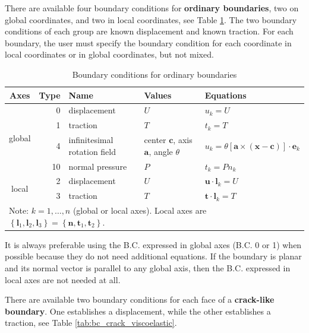 \documentclass[a4paper,fleqn]{book}
\begin{document}
There are available four boundary conditions for \textbf{ordinary boundaries}, two on global coordinates, and two in local coordinates, see Table \ref{tab:bc_ordinary_viscoelastic}. The two boundary conditions of each group are known displacement and known traction. For each boundary, the user must specify the boundary condition for each coordinate in local coordinates or in global coordinates, but not mixed.

\begin{table}[h]
\centering
{\footnotesize
\begin{tabular}{crlll}
\textbf{Axes} & \textbf{Type} & \textbf{Name} & \textbf{Values} & \textbf{Equations} \\
\midrule
\multirow{4}{*}{global} & 0 & displacement & $U$ & $u_k=U$ \\
\cline{2-5}
                        & 1 & traction     & $T$ & $t_k=T$ \\
\cline{2-5}
                        & 4 & infinitesimal rotation field & center $\mathbf{c}$, axis $\mathbf{a}$, angle $\theta$ & $u_k=\theta\left[\mathbf{a}\times\left(\mathbf{x}-\mathbf{c}\right)\right]\cdot\mathbf{e}_k$ \\
\cline{2-5}
                        & 10 & normal pressure & $P$ & $t_k=Pn_k$ \\
\hline
\multirow{2}{*}{local}  & 2 & displacement & $U$ & $\mathbf{u}\cdot\mathbf{l}_k=U$ \\
\cline{2-5}
                        & 3 & traction     & $T$ & $\mathbf{t}\cdot\mathbf{l}_k=T$ \\
\midrule
\multicolumn{5}{l}{Note: $k=1,\ldots,n$ (global or local axes). Local axes are $\left\{\mathbf{l}_1,\mathbf{l}_2,\mathbf{l}_3\right\}=\left\{\mathbf{n},\mathbf{t}_1,\mathbf{t}_2\right\}$.} \\
\end{tabular}
}
\caption{Boundary conditions for ordinary boundaries}
\label{tab:bc_ordinary_viscoelastic}
\end{table}

It is always preferable using the B.C. expressed in global axes (B.C. 0 or 1) when possible because they do not need additional equations. If the boundary is planar and its normal vector is parallel to any global axis, then the B.C. expressed in local axes are not needed at all.

There are available two boundary conditions for each face of a \textbf{crack-like boundary}. One establishes a displacement, while the other establishes a traction, see Table \ref{tab:bc_crack_viscoelastic}.
\end{document}
